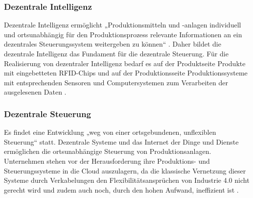 \subsubsection{Dezentrale Intelligenz}\label{sec:DezentraleIntelligenz}
Dezentrale Intelligenz ermöglicht „Produktionsmitteln und -anlagen individuell und ortsunabhängig für den Produktionsprozess relevante Informationen an ein dezentrales Steuerungssystem weitergeben zu können“ \cite[S.39]{14}. Daher bildet die dezentrale Intelligenz das Fundament für die dezentrale Steuerung. 
Für die Realisierung von dezentraler Intelligenz bedarf es auf der Produktseite Produkte mit eingebetteten RFID-Chips und auf der Produktionsseite Produktionssysteme mit entsprechenden Sensoren und Computersystemen zum Verarbeiten der ausgelesenen Daten \cite[S.39]{14}.

\subsubsection{Dezentrale Steuerung}\label{sec:DezentraleSteuerung}
Es findet eine Entwicklung „weg von einer ortsgebundenen, unflexiblen Steuerung“ \cite[S.40]{14} statt. Dezentrale Systeme und das Internet der Dinge und Dienste ermöglichen die ortsunabhängige Steuerung von Produktionsanlagen.
Unternehmen stehen vor der Herausforderung ihre Produktions- und Steuerungssysteme in die Cloud auszulagern, da die klassische Vernetzung dieser Systeme durch Verkabelungen den Flexibilitätsansprüchen von Industrie 4.0 nicht gerecht wird und zudem auch noch, durch den hohen Aufwand, ineffizient ist \cite[S.40]{14}.


